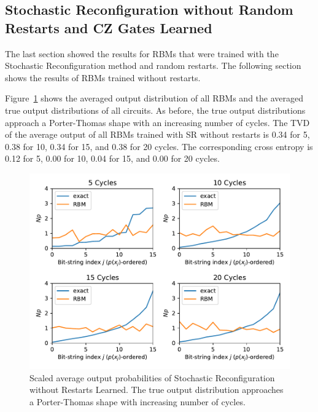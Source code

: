 \newpage

\subsection{Stochastic Reconfiguration without Random Restarts and CZ Gates Learned}

The last section showed the results for RBMs that were trained with the Stochastic Reconfiguration
method and random restarts. The following section shows the results of RBMs trained without restarts.

Figure~\ref{fig:sr_no_restarts_avgPDF} shows the averaged output distribution of all RBMs and
the averaged true output distributions of all circuits. As before, the 
true output distributions approach a Porter-Thomas shape with an increasing number of cycles.
The TVD of the average output of all RBMs trained with SR without restarts
is 0.34 for 5, 0.38 for 10, 0.34 for 15, and 0.38 for 20 cycles. The corresponding cross entropy is 
0.12 for 5, 0.00 for 10, 0.04 for 15, and 0.00 for 20 cycles.

\begin{figure}[H]
  \centering
  \includegraphics[width=\textwidth]{figures/results/SR-no-restarts-learned/avgPDF.pdf}
  \caption[Scaled average output probabilities of Stochastic Reconfiguration without Restarts Learned]{
    Scaled average output probabilities of Stochastic Reconfiguration without Restarts Learned. The true 
    output distribution approaches a Porter-Thomas shape with increasing number of cycles.}
  \label{fig:sr_no_restarts_avgPDF}
\end{figure}

